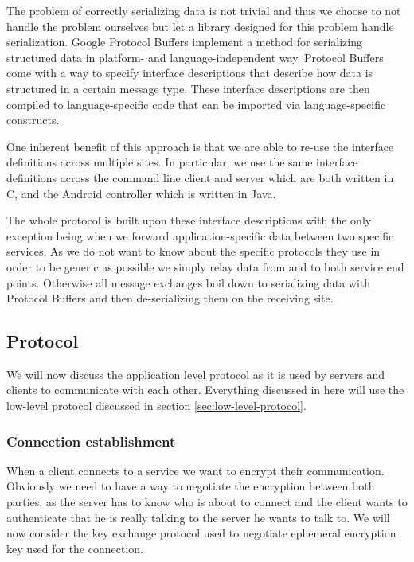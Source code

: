 The problem of correctly serializing data is not trivial and thus we choose to not handle the problem ourselves but let a library designed for this problem handle serialization.
Google Protocol Buffers \cite{varda2008protocol} implement a method for serializing structured data in platform- and language-independent way.
Protocol Buffers come with a way to specify interface descriptions that describe how data is structured in a certain message type.
These interface descriptions are then compiled to language-specific code that can be imported via language-specific constructs.

One inherent benefit of this approach is that we are able to re-use the interface definitions across multiple sites.
In particular, we use the same interface definitions across the command line client and server which are both written in C, and the Android controller which is written in Java.

The whole protocol is built upon these interface descriptions with the only exception being when we forward application-specific data between two specific services.
As we do not want to know about the specific protocols they use in order to be generic as possible we simply relay data from and to both service end points.
Otherwise all message exchanges boil down to serializing data with Protocol Buffers and then de-serializing them on the receiving site.

\subsection{Protocol}
\label{sec:protocol}

We will now discuss the application level protocol as it is used by servers and clients to communicate with each other.
Everything discussed in here will use the low-level protocol discussed in section \ref{sec:low-level-protocol}.

\subsubsection{Connection establishment}
\label{sec:connection-establishment}

When a client connects to a service we want to encrypt their communication.
Obviously we need to have a way to negotiate the encryption between both parties, as the server has to know who is about to connect and the client wants to authenticate that he is really talking to the server he wants to talk to.
We will now consider the key exchange protocol used to negotiate ephemeral encryption key used for the connection.

